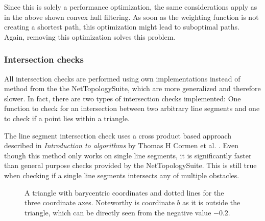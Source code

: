 			Since this is solely a performance optimization, the same considerations apply as in the above shown convex hull filtering.
			As soon as the weighting function is not creating a shortest path, this optimization might lead to suboptimal paths.
			Again, removing this optimization solves this problem.
			
		\subsubsection{Intersection checks}
		\label{subsubsec:intersection-checks}
			
			All intersection checks are performed using own implementations instead of method from the the NetTopologySuite, which are more generalized and therefore slower.
			In fact, there are two types of intersection checks implemented:
			One function to check for an intersection between two arbitrary line segments and one to check if a point lies within a triangle.
			
			The line segment intersection check uses a cross product based approach described in \emph{Introduction to algorithms} by Thomas H Cormen et al. \cite[1018]{cormen-introduction-to-alg}.
			Even though this method only works on single line segments, it is significantly faster than general purpose checks provided by the NetTopologySuite.
			This is still true when checking if a single line segments intersects any of multiple obstacles.
			
			\begin{figure}[h]
				\begin{figcenter}
				\end{figcenter}
				\caption{A triangle with barycentric coordinates and dotted lines for the three coordinate axes. Noteworthy is coordinate $b$ as it is outside the triangle, which can be directly seen from the negative value $-0.2$.}
				\label{fig:barycentric-triangle}
			\end{figure}
			
